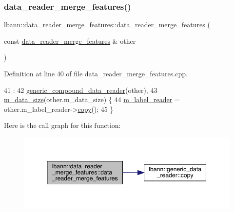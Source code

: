 \subsubsection{\texorpdfstring{data\+\_\+reader\+\_\+merge\+\_\+features()}{data\_reader\_merge\_features()}\hspace{0.1cm}{\footnotesize\ttfamily [2/2]}}
{\footnotesize\ttfamily lbann\+::data\+\_\+reader\+\_\+merge\+\_\+features\+::data\+\_\+reader\+\_\+merge\+\_\+features (\begin{DoxyParamCaption}\item[{const \hyperlink{classlbann_1_1data__reader__merge__features}{data\+\_\+reader\+\_\+merge\+\_\+features} \&}]{other }\end{DoxyParamCaption})}



Definition at line 40 of file data\+\_\+reader\+\_\+merge\+\_\+features.\+cpp.


\begin{DoxyCode}
41                                            :
42   \hyperlink{classlbann_1_1generic__compound__data__reader_ab2ed3059169e556e4310a55fa99c1f07}{generic\_compound\_data\_reader}(other),
43   \hyperlink{classlbann_1_1data__reader__merge__features_ac9c56e08a45a5beac97e41e403fbaa12}{m\_data\_size}(other.m\_data\_size) \{
44   \hyperlink{classlbann_1_1data__reader__merge__features_a1e54a136c63b934f44ff91dc68ea3b27}{m\_label\_reader} = other.m\_label\_reader->\hyperlink{classlbann_1_1generic__data__reader_a208ba1223e7aaa75e94b728501f12f86}{copy}();
45 \}
\end{DoxyCode}
Here is the call graph for this function\+:\nopagebreak
\begin{figure}[H]
\begin{center}
\leavevmode
\includegraphics[width=346pt]{classlbann_1_1data__reader__merge__features_a41d55ea605d94ea010126b11ee420778_cgraph}
\end{center}
\end{figure}
\mbox{\label{classlbann_1_1data__reader__merge__features_af194453b7028b116657b95631acca81d}} 
